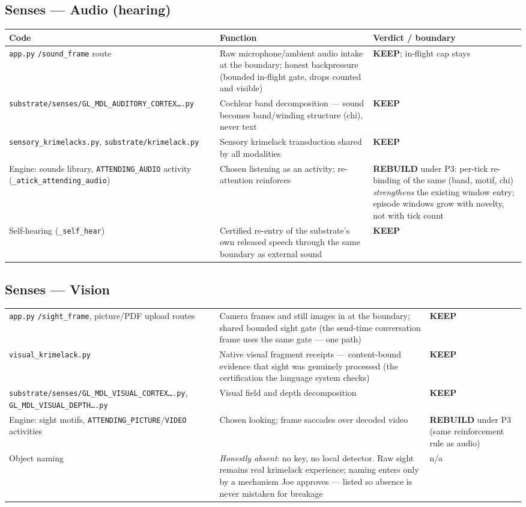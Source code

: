 \documentclass[11pt]{article}
\newcommand{\keep}{\textbf{KEEP}}
\newcommand{\rebuild}{\textbf{REBUILD}}
\begin{document}
\subsection{Senses — Audio (hearing)}
\begin{longtable}{p{} p{} p{}}
\toprule
\textbf{Code} & \textbf{Function} & \textbf{Verdict / boundary} \\
\midrule
\texttt{app.py} \texttt{/sound\_frame} route &
Raw microphone/ambient audio intake at the boundary; honest backpressure
(bounded in-flight gate, drops counted and visible) &
\keep{}; in-flight cap stays \\
\texttt{substrate/senses/GL\_MDL\_AUDITORY\_CORTEX\ldots.py} &
Cochlear band decomposition — sound becomes band/winding structure (chi),
never text &
\keep{} \\
\texttt{sensory\_krimelacks.py}, \texttt{substrate/krimelack.py} &
Sensory krimelack transduction shared by all modalities &
\keep{} \\
Engine: sounds library, \texttt{ATTENDING\_AUDIO} activity
(\texttt{\_atick\_attending\_audio}) &
Chosen listening as an activity; re-attention reinforces &
\rebuild{} under P3: per-tick re-binding of the same (band, motif, chi)
\emph{strengthens} the existing window entry; episode windows grow with
novelty, not with tick count \\
Self-hearing (\texttt{\_self\_hear}) &
Certified re-entry of the substrate's own released speech through the same
boundary as external sound &
\keep{} \\
\bottomrule
\end{longtable}

\subsection{Senses — Vision}
\begin{longtable}{p{} p{} p{}}
\toprule
\texttt{app.py} \texttt{/sight\_frame}, picture/PDF upload routes &
Camera frames and still images in at the boundary; shared bounded sight gate
(the send-time conversation frame uses the same gate — one path) &
\keep{} \\
\texttt{visual\_krimelack.py} &
Native visual fragment receipts — content-bound evidence that sight was
genuinely processed (the certification the language system checks) &
\keep{} \\
\texttt{substrate/senses/GL\_MDL\_VISUAL\_CORTEX\ldots.py},
\texttt{GL\_MDL\_VISUAL\_DEPTH\ldots.py} &
Visual field and depth decomposition &
\keep{} \\
Engine: sight motifs, \texttt{ATTENDING\_PICTURE}/\texttt{VIDEO} activities &
Chosen looking; frame saccades over decoded video &
\rebuild{} under P3 (same reinforcement rule as audio) \\
Object naming &
\emph{Honestly absent}: no key, no local detector. Raw sight remains real
krimelack experience; naming enters only by a mechanism Joe approves —
listed so absence is never mistaken for breakage &
n/a \\
\bottomrule
\end{longtable}
\end{document}
